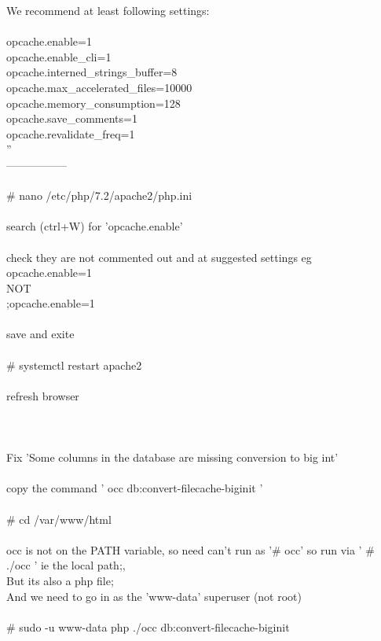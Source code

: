 \documentclass[10pt,a4paper]{article}
\begin{document}
{	We recommend at least following settings:\\
\\
			opcache.enable=1\\
			opcache.enable\_cli=1\\
			opcache.interned\_strings\_buffer=8\\
			opcache.max\_accelerated\_files=10000\\
			opcache.memory\_consumption=128\\
			opcache.save\_comments=1\\
			opcache.revalidate\_freq=1\\
	''	\\
	-----------------\\
\\
		\# nano /etc/php/7.2/apache2/php.ini}{\large \\
	\\
		search (ctrl+W) for 'opcache.enable'\\
		\\
		check they are not commented out  and at suggested settings eg \\
		opcache.enable=1 \\
			NOT \\
		;opcache.enable=1\\
\\
		save and exite\\
\\
		\# systemctl restart apache2\\
\\
		refresh browser\\
\\
	\\
\\
	Fix 'Some columns in the database are missing conversion to big int'\\
\\
		copy the command ' occ db:convert-filecache-biginit '\\
		\\
			\# cd /var/www/html}{\large \\
\\
		occ is not on the PATH variable, so need can't run as '\# occ' so run via ' \# ./occ ' ie the local path;,\\
		But its also a php file;\\
	And we need to go in as the 'www-data' superuser (not root)\\
\\
			\# sudo -u www-data php ./occ db:convert-filecache-biginit\\
}
\end{document}
